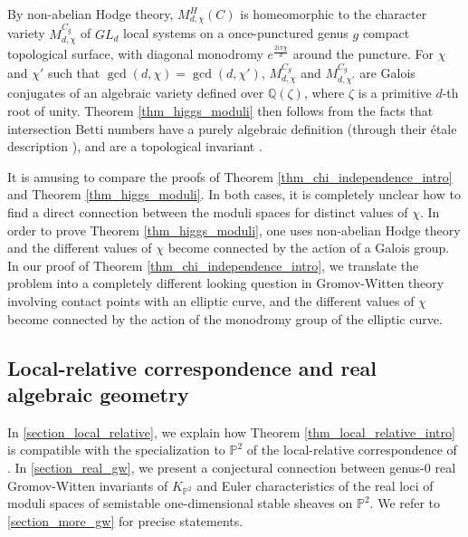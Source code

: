\documentclass[11pt,letterpaper]{amsart}
\newcommand\PP{\mathbb P}
\newcommand\Q{\mathbb Q}
\begin{document}
By non-abelian Hodge theory,
$M_{d,\chi}^H(C)$ is homeomorphic to the character variety $M_{d,\chi}^{C_g}$ of $GL_d$ local systems on a once-punctured genus $g$ compact topological surface, with diagonal monodromy $e^{\frac{2i\pi \chi}{d}}$ around the puncture.
For $\chi$ and $\chi'$ such that $\gcd(d,\chi)=\gcd(d,\chi')$, $M_{d,\chi}^{C_g}$
and $M_{d,\chi'}^{C_g}$ are Galois conjugates of an algebraic variety defined over $\Q(\zeta)$, where $\zeta$ is a primitive $d$-th root of unity. Theorem \ref{thm_higgs_moduli} then follows from the facts that intersection Betti numbers have a purely algebraic definition (through their \'etale description \cite{MR751966}), and are a topological invariant \cite{MR696691}. 

It is amusing to compare the proofs of Theorem \ref{thm_chi_independence_intro} and Theorem 
\ref{thm_higgs_moduli}. In both cases, it is completely unclear how to find a direct connection between the moduli spaces for distinct values of $\chi$. In order to prove Theorem 
\ref{thm_higgs_moduli},  one uses non-abelian Hodge theory and the different values of $\chi$ become connected by the action of a Galois group. 
In our proof of Theorem \ref{thm_chi_independence_intro}, 
we translate the problem into a completely different looking question in Gromov-Witten theory involving contact points with an elliptic curve, 
and the different values of $\chi$ become connected by the action of the monodromy group of the elliptic curve.


\subsection{Local-relative correspondence and real algebraic geometry}
In \cref{section_local_relative}, we explain how Theorem \ref{thm_local_relative_intro} is compatible with the specialization to 
$\PP^2$ of the local-relative correspondence of \cite{MR3948687}.
In \cref{section_real_gw}, we present a conjectural connection between genus-$0$ real Gromov-Witten invariants of $K_{\PP^2}$ and Euler characteristics of the real loci of moduli spaces of semistable one-dimensional stable sheaves on $\PP^2$. 
We refer to
\cref{section_more_gw} for precise statements.
\end{document}
